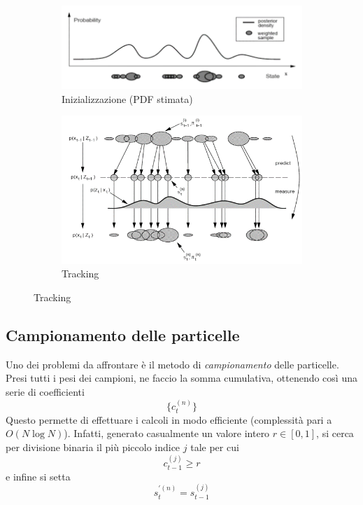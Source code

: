 \documentclass[a4paper,oneside,titlepage]{book}
\begin{document}
\begin{figure}[htp]
	\begin{subfigure}{0.49\textwidth}
	    \centering
		\includegraphics[width=\textwidth, height=\textheight, keepaspectratio]{condensation1.png}
		\caption{Inizializzazione (PDF stimata)}
	\end{subfigure}
	\hfill
	\begin{subfigure}{0.49\textwidth}
	    \centering
		\includegraphics[width=\textwidth, height=\textheight, keepaspectratio]{condensation2.png}
		\caption{Tracking}
	\end{subfigure}
\end{figure}
\newpage

\subsection{Campionamento delle particelle}
Uno dei problemi da affrontare è il metodo di \textit{campionamento} delle particelle. Presi tutti i pesi dei campioni, ne faccio la somma cumulativa, ottenendo così una serie di coefficienti
\[ \{ c_t^{(n)} \} \]
Questo permette di effettuare i calcoli in modo efficiente (complessità pari a $O(N \log N)$). Infatti, generato casualmente un valore intero $r \in [0,1]$, si cerca per divisione binaria il più piccolo indice $j$ tale per cui
\[ c_{t-1}^{(j)} \geq r \]
e infine si setta
\[ s_t^{'(n)} = s_{t-1}^{(j)} \]
\end{document}
